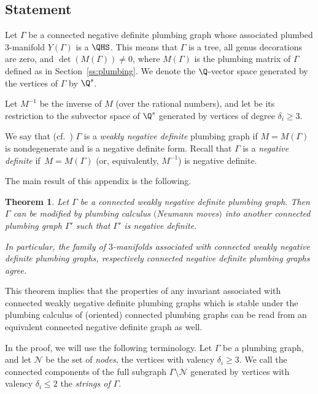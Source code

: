 \documentclass[10pt,a4paper]{amsart}
\newcounter{theorem}
\newtheorem{Theorem}{Theorem}[section]
\begin{document}
\subsection{Statement} Let $\Gamma$ be a connected negative definite plumbing graph whose associated plumbed 3-manifold $Y(\Gamma)$ is a $\QHS$. This means that $\Gamma$ is a tree, all genus decorations are zero, and $\det(M(\Gamma))\not=0$, where $M(\Gamma)$ is the plumbing matrix of $\Gamma$
 defined as in Section~\ref{ss:plumbing}. We denote the $\Q$-vector space generated by the vertices of $\Gamma$ by
 $\Q^s$.

 Let $M^{-1}$ be the inverse of $M$ (over the rational numbers), and let 
 be its restriction to the subvector space of $\Q^s$ generated by vertices of degree $\delta_i\geq 3$.

We say that (cf.~\cite[Definition~4.3]{GM21}) $\Gamma$ is a \emph{weakly negative definite} plumbing graph
if ${M\!=\!M(\Gamma)}$ is nondegenerate and  is a negative definite form.
Recall that $\Gamma$ is a {\it negative definite }
if~${M=M(\Gamma)}$ \big(or, equivalently, $M^{-1}$\big) is negative definite.

The main result of this appendix is the following.


\begin{Theorem}\label{th:app}
Let $\Gamma$ be a connected weakly negative definite plumbing graph. Then $\Gamma$ can be modified
 by plumbing calculus $($Neumann moves$)$ into another connected plumbing graph $\Gamma'$ such that
$\Gamma'$ is negative definite.

In particular, the family of $3$-manifolds associated with connected weakly negative definite plumbing graphs, respectively connected negative definite plumbing graphs agree.
\end{Theorem}


This theorem implies that the properties of any invariant associated with connected weakly negative definite plumbing graphs which is stable under the plumbing calculus of (oriented) connected plumbing graphs can be read from an equivalent
connected negative definite graph as well.

In the proof, we will use the following terminology.
Let $\Gamma$ be a plumbing graph, and let $\mathcal{N}$ be the set of \emph{nodes}, the vertices with valency $\delta_i\geq 3$. We call the connected components of the
full subgraph $\Gamma\setminus \mathcal{N}$
generated by vertices with valency $\delta_i\leq 2$ the \emph{strings of $\Gamma$}.
\end{document}
